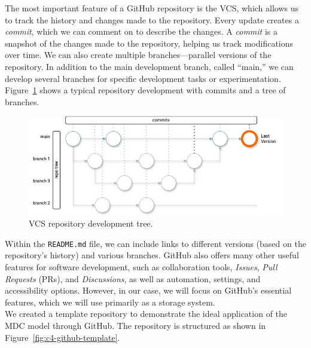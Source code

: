 The most important feature of a GitHub repository is the VCS, which allows us to track the history and changes made to the repository. Every update creates a \textit{commit}, which we can comment on to describe the changes. A \textit{commit} is a snapshot of the changes made to the repository, helping us track modifications over time. We can also create multiple branches—parallel versions of the repository. In addition to the main development branch, called ``main,'' we can develop several branches for specific development tasks or experimentation. Figure~\ref{fig:c4-github-tree} shows a typical repository development with commits and a tree of branches.

\begin{figure}[!h]
    \centering
    \includegraphics[width=1\linewidth]{chapters/4-MDC_model_application/image/graph04-githubtree.png}
    \caption{VCS repository development tree.}
    \label{fig:c4-github-tree}
\end{figure}

Within the \texttt{README.md} file, we can include links to different versions (based on the repository’s history) and various branches. GitHub also offers many other useful features for software development, such as collaboration tools, \textit{Issues}, \textit{Pull Requests} (PRs), and \textit{Discussions}, as well as automation, settings, and accessibility options. However, in our case, we will focus on GitHub’s essential features, which we will use primarily as a storage system.\\
We created a template repository to demonstrate the ideal application of the MDC model through GitHub. The repository is structured as shown in Figure~\ref{fig:c4-github-template}.

